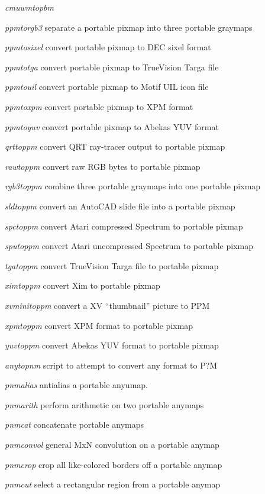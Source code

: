 \begin{TPlist}{{\it cmuwmtopbm}}
\item[{{\it ppmtorgb3}}]
separate a portable pixmap into three portable graymaps
\item[{{\it ppmtosixel}}]
convert portable pixmap to DEC sixel format
\item[{{\it ppmtotga}}]
convert portable pixmap to TrueVision Targa file
\item[{{\it ppmtouil}}]
convert portable pixmap to Motif UIL icon file
\item[{{\it ppmtoxpm}}]
convert portable pixmap to XPM format
\item[{{\it ppmtoyuv}}]
convert portable pixmap to Abekas YUV format
\item[{{\it qrttoppm}}]
convert QRT ray-tracer output to portable pixmap
\item[{{\it rawtoppm}}]
convert raw RGB bytes to portable pixmap
\item[{{\it rgb3toppm}}]
combine three portable graymaps into one portable pixmap
\item[{{\it sldtoppm}}]
convert an AutoCAD slide file into a portable pixmap
\item[{{\it spctoppm}}]
convert Atari compressed Spectrum to portable pixmap
\item[{{\it sputoppm}}]
convert Atari uncompressed Spectrum to portable pixmap
\item[{{\it tgatoppm}}]
convert TrueVision Targa file to portable pixmap
\item[{{\it ximtoppm}}]
convert Xim to portable pixmap
\item[{{\it xvminitoppm}}]
convert a XV ``thumbnail'' picture to PPM
\item[{{\it xpmtoppm}}]
convert XPM format to portable pixmap
\item[{{\it yuvtoppm}}]
convert Abekas YUV format to portable pixmap
\item[{{\it anytopnm}}]
script to attempt to convert any format to P?M
\item[{{\it pnmalias}}]
antialias a portable anyumap.
\item[{{\it pnmarith}}]
perform arithmetic on two portable anymaps
\item[{{\it pnmcat}}]
concatenate portable anymaps
\item[{{\it pnmconvol}}]
general MxN convolution on a portable anymap
\item[{{\it pnmcrop}}]
crop all like-colored borders off a portable anymap
\item[{{\it pnmcut}}]
select a rectangular region from a portable anymap

\end{TPlist}

